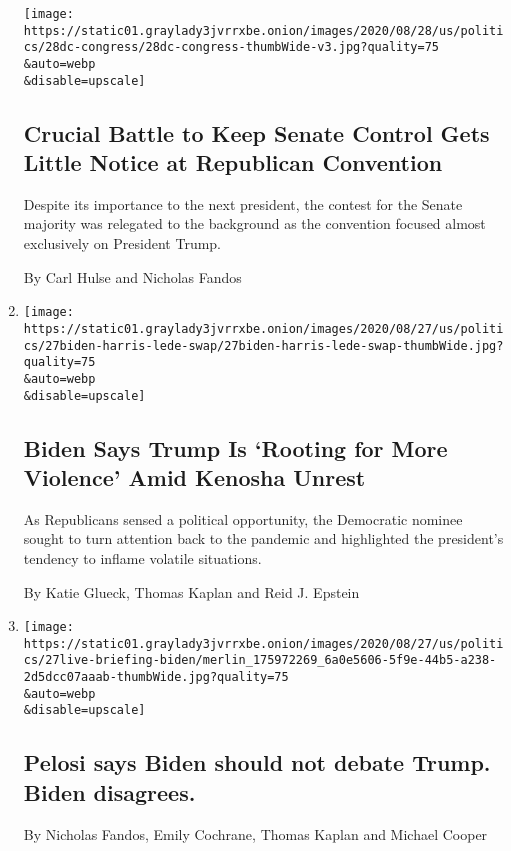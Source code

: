 \begin{enumerate}
  \texttt{[image: https://static01.graylady3jvrrxbe.onion/images/2020/08/28/us/politics/28dc-congress/28dc-congress-thumbWide-v3.jpg?quality=75\\\&auto=webp\\\&disable=upscale]}

  \hypertarget{crucial-battle-to-keep-senate-control-gets-little-notice-at-republican-convention}{%
  \subsection{Crucial Battle to Keep Senate Control Gets Little Notice
  at Republican
  Convention}\label{crucial-battle-to-keep-senate-control-gets-little-notice-at-republican-convention}}

  Despite its importance to the next president, the contest for the
  Senate majority was relegated to the background as the convention
  focused almost exclusively on President Trump.

  By Carl Hulse and Nicholas Fandos
\item
  \href{/2020/08/27/us/politics/biden-kamala-harris-speech-trump.html}{}

  \texttt{[image: https://static01.graylady3jvrrxbe.onion/images/2020/08/27/us/politics/27biden-harris-lede-swap/27biden-harris-lede-swap-thumbWide.jpg?quality=75\\\&auto=webp\\\&disable=upscale]}

  \hypertarget{biden-says-trump-is-rooting-for-more-violence-amid-kenosha-unrest}{%
  \subsection{Biden Says Trump Is `Rooting for More Violence' Amid
  Kenosha
  Unrest}\label{biden-says-trump-is-rooting-for-more-violence-amid-kenosha-unrest}}

  As Republicans sensed a political opportunity, the Democratic nominee
  sought to turn attention back to the pandemic and highlighted the
  president's tendency to inflame volatile situations.

  By Katie Glueck, Thomas Kaplan and Reid J. Epstein
\item
  \href{/2020/08/27/us/elections/pelosi-says-biden-should-not-debate-trump-biden-disagrees.html}{}

  \texttt{[image: https://static01.graylady3jvrrxbe.onion/images/2020/08/27/us/politics/27live-briefing-biden/merlin\_175972269\_6a0e5606-5f9e-44b5-a238-2d5dcc07aaab-thumbWide.jpg?quality=75\\\&auto=webp\\\&disable=upscale]}

  \hypertarget{pelosi-says-biden-should-not-debate-trump-biden-disagrees}{%
  \subsection{Pelosi says Biden should not debate Trump. Biden
  disagrees.}\label{pelosi-says-biden-should-not-debate-trump-biden-disagrees}}

  By Nicholas Fandos, Emily Cochrane, Thomas Kaplan and Michael Cooper
\end{enumerate}

